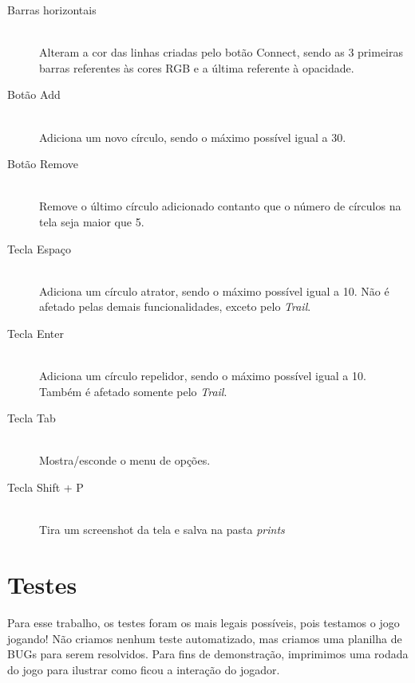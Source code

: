 \documentclass[12pt]{article}
\begin{document}
\begin{description}
\item[Barras horizontais] \hfill \\
Alteram a cor das linhas criadas pelo botão Connect, sendo as 3 primeiras barras referentes às cores RGB e a última referente à opacidade.
\vspace{0.4 true cm}

\item[Botão Add] \hfill \\
Adiciona um novo círculo, sendo o máximo possível igual a 30.
\vspace{0.4 true cm}

\item[Botão Remove] \hfill \\
Remove o último círculo adicionado contanto que o número de círculos na tela seja maior que 5.
\vspace{0.4 true cm}

\item[Tecla Espaço] \hfill \\
Adiciona um círculo atrator, sendo o máximo possível igual a 10. Não é afetado pelas demais funcionalidades, exceto pelo \textit{Trail}.
\vspace{0.4 true cm}

\item[Tecla Enter] \hfill \\
Adiciona um círculo repelidor, sendo o máximo possível igual a 10. Também é afetado somente pelo \textit{Trail}.
\vspace{0.4 true cm}

\item[Tecla Tab] \hfill \\
Mostra/esconde o menu de opções.
\vspace{0.4 true cm}

\item[Tecla Shift + P] \hfill \\
Tira um screenshot da tela e salva na pasta \textit{prints}

\end{description}

\section{Testes}
\label{testes}
Para esse trabalho, os testes foram os mais legais possíveis, pois testamos o jogo jogando! Não criamos nenhum teste automatizado, mas criamos uma planilha de BUGs para serem resolvidos. Para fins de demonstração, imprimimos uma rodada do jogo para ilustrar como ficou a interação do jogador.
\end{document}
